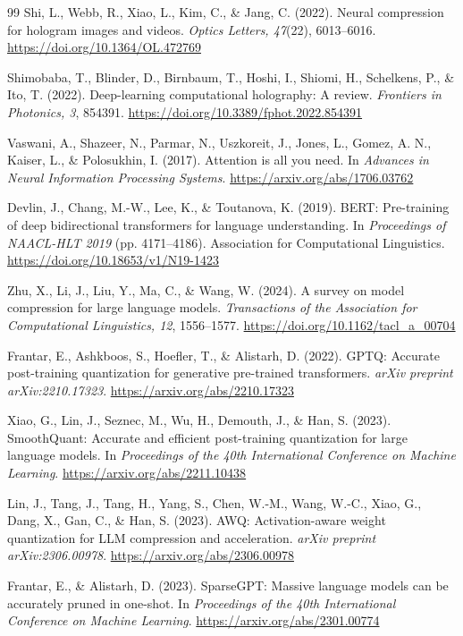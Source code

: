 \documentclass{article}
\begin{document}
\begin{normalsize}
\begin{thebibliography}{99}
Shi, L., Webb, R., Xiao, L., Kim, C., \& Jang, C. (2022). Neural compression for hologram images and videos. \textit{Optics Letters, 47}(22), 6013--6016. 
\url{https://doi.org/10.1364/OL.472769}

Shimobaba, T., Blinder, D., Birnbaum, T., Hoshi, I., Shiomi, H., Schelkens, P., \& Ito, T. (2022). Deep-learning computational holography: A review. \textit{Frontiers in Photonics, 3}, 854391. 
\url{https://doi.org/10.3389/fphot.2022.854391}

Vaswani, A., Shazeer, N., Parmar, N., Uszkoreit, J., Jones, L., Gomez, A. N., Kaiser, L., \& Polosukhin, I. (2017). Attention is all you need. In \textit{Advances in Neural Information Processing Systems}. 
\url{https://arxiv.org/abs/1706.03762}

Devlin, J., Chang, M.-W., Lee, K., \& Toutanova, K. (2019). BERT: Pre-training of deep bidirectional transformers for language understanding. In \textit{Proceedings of NAACL-HLT 2019} (pp. 4171--4186). Association for Computational Linguistics. 
\url{https://doi.org/10.18653/v1/N19-1423}

Zhu, X., Li, J., Liu, Y., Ma, C., \& Wang, W. (2024). A survey on model compression for large language models. \textit{Transactions of the Association for Computational Linguistics, 12}, 1556--1577. 
\url{https://doi.org/10.1162/tacl_a_00704}

Frantar, E., Ashkboos, S., Hoefler, T., \& Alistarh, D. (2022). GPTQ: Accurate post-training quantization for generative pre-trained transformers. \textit{arXiv preprint arXiv:2210.17323}. 
\url{https://arxiv.org/abs/2210.17323}

Xiao, G., Lin, J., Seznec, M., Wu, H., Demouth, J., \& Han, S. (2023). SmoothQuant: Accurate and efficient post-training quantization for large language models. In \textit{Proceedings of the 40th International Conference on Machine Learning}. 
\url{https://arxiv.org/abs/2211.10438}

Lin, J., Tang, J., Tang, H., Yang, S., Chen, W.-M., Wang, W.-C., Xiao, G., Dang, X., Gan, C., \& Han, S. (2023). AWQ: Activation-aware weight quantization for LLM compression and acceleration. \textit{arXiv preprint arXiv:2306.00978}. 
\url{https://arxiv.org/abs/2306.00978}

Frantar, E., \& Alistarh, D. (2023). SparseGPT: Massive language models can be accurately pruned in one-shot. In \textit{Proceedings of the 40th International Conference on Machine Learning}. 
\url{https://arxiv.org/abs/2301.00774}


\end{thebibliography}
\end{normalsize}
\end{document}
